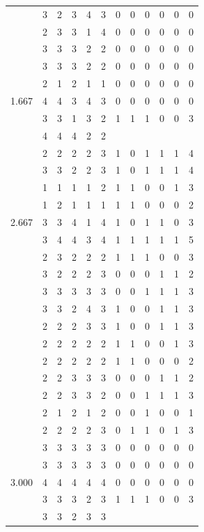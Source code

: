 \documentclass[]{book}
\theoremstyle{definition}
\theoremstyle{definition}
\theoremstyle{definition}
\theoremstyle{remark}
\begin{document}
\begin{table}
{\begin{tabular}[t]{rrrrrrrrrrrr}
 & 3 & 2 & 3 & 4 & 3 & 0 & 0 & 0 & 0 & 0 & 0\\
 & 2 & 3 & 3 & 1 & 4 & 0 & 0 & 0 & 0 & 0 & 0\\
 & 3 & 3 & 3 & 2 & 2 & 0 & 0 & 0 & 0 & 0 & 0\\
 & 3 & 3 & 3 & 2 & 2 & 0 & 0 & 0 & 0 & 0 & 0\\
 & 2 & 1 & 2 & 1 & 1 & 0 & 0 & 0 & 0 & 0 & 0\\
1.667 & 4 & 4 & 3 & 4 & 3 & 0 & 0 & 0 & 0 & 0 & 0\\
 & 3 & 3 & 1 & 3 & 2 & 1 & 1 & 1 & 0 & 0 & 3\\
 & 4 & 4 & 4 & 2 & 2 &  &  &  &  &  & \\
 & 2 & 2 & 2 & 2 & 3 & 1 & 0 & 1 & 1 & 1 & 4\\
 & 3 & 3 & 2 & 2 & 3 & 1 & 0 & 1 & 1 & 1 & 4\\
 & 1 & 1 & 1 & 1 & 2 & 1 & 1 & 0 & 0 & 1 & 3\\
 & 1 & 2 & 1 & 1 & 1 & 1 & 1 & 0 & 0 & 0 & 2\\
2.667 & 3 & 3 & 4 & 1 & 4 & 1 & 0 & 1 & 1 & 0 & 3\\
 & 3 & 4 & 4 & 3 & 4 & 1 & 1 & 1 & 1 & 1 & 5\\
 & 2 & 3 & 2 & 2 & 2 & 1 & 1 & 1 & 0 & 0 & 3\\
 & 3 & 2 & 2 & 2 & 3 & 0 & 0 & 0 & 1 & 1 & 2\\
 & 3 & 3 & 3 & 3 & 3 & 0 & 0 & 1 & 1 & 1 & 3\\
 & 3 & 3 & 2 & 4 & 3 & 1 & 0 & 0 & 1 & 1 & 3\\
 & 2 & 2 & 2 & 3 & 3 & 1 & 0 & 0 & 1 & 1 & 3\\
 & 2 & 2 & 2 & 2 & 2 & 1 & 1 & 0 & 0 & 1 & 3\\
 & 2 & 2 & 2 & 2 & 2 & 1 & 1 & 0 & 0 & 0 & 2\\
 & 2 & 2 & 3 & 3 & 3 & 0 & 0 & 0 & 1 & 1 & 2\\
 & 2 & 2 & 3 & 3 & 2 & 0 & 0 & 1 & 1 & 1 & 3\\
 & 2 & 1 & 2 & 1 & 2 & 0 & 0 & 1 & 0 & 0 & 1\\
 & 2 & 2 & 2 & 2 & 3 & 0 & 1 & 1 & 0 & 1 & 3\\
 & 3 & 3 & 3 & 3 & 3 & 0 & 0 & 0 & 0 & 0 & 0\\
 & 3 & 3 & 3 & 3 & 3 & 0 & 0 & 0 & 0 & 0 & 0\\
3.000 & 4 & 4 & 4 & 4 & 4 & 0 & 0 & 0 & 0 & 0 & 0\\
 & 3 & 3 & 3 & 2 & 3 & 1 & 1 & 1 & 0 & 0 & 3\\
 & 3 & 3 & 2 & 3 & 3 &  &  &  &  &  & \\

\end{tabular}}
\end{table}
\end{document}
